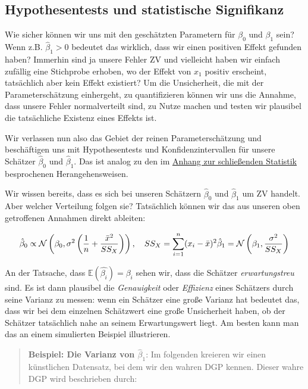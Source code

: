 \documentclass[]{book}
\begin{document}
\subsection{Hypothesentests und statistische
Signifikanz}\label{hypothesentests-und-statistische-signifikanz}

Wie sicher können wir uns mit den geschätzten Parametern für \(\beta_0\)
und \(\beta_1\) sein? Wenn z.B. \(\hat{\beta}_1>0\) bedeutet das
wirklich, dass wir einen positiven Effekt gefunden haben? Immerhin sind
ja unsere Fehler ZV und vielleicht haben wir einfach zufällig eine
Stichprobe erhoben, wo der Effekt von \(x_1\) positiv erscheint,
tatsächlich aber kein Effekt existiert? Um die Unsicherheit, die mit der
Parameterschätzung einhergeht, zu quantifizieren können wir uns die
Annahme, dass unsere Fehler normalverteilt sind, zu Nutze machen und
testen wir plausibel die tatsächliche Existenz eines Effekts ist.

Wir verlassen nun also das Gebiet der reinen Parameterschätzung und
beschäftigen uns mit Hypothesentests und Konfidenzintervallen für unsere
Schätzer \(\hat{\beta}_0\) und \(\hat{\beta}_1\). Das ist analog zu den
im \protect\hyperlink{stat-rep}{Anhang zur schließenden Statistik}
besprochenen Herangehensweisen.

Wir wissen bereits, dass es sich bei unseren Schätzern \(\hat{\beta}_0\)
und \(\hat{\beta}_1\) um ZV handelt. Aber welcher Verteilung folgen sie?
Tatsächlich können wir das aus unseren oben getroffenen Annahmen direkt
ableiten:

\[\hat{\beta}_0 \propto \mathcal{N}\left(\beta_0, \sigma^2\left( \frac{1}{n} +
\frac{\bar{x}^2}{SS_X}\right) \right), \quad SS_X=\sum_{i=1}^n(x_i-\bar{x})^2\\
\hat{\beta}_1 = \mathcal{N}\left(\beta_1, \frac{\sigma^2}{SS_X}\right)\]

An der Tatsache, dass \(\mathbb{E}(\hat{\beta_i})=\beta_i\) sehen wir,
dass die Schätzer \emph{erwartungstreu} sind. Es ist dann plausibel die
\emph{Genauigkeit} oder \emph{Effizienz} eines Schätzers durch seine
Varianz zu messen: wenn ein Schätzer eine große Varianz hat bedeutet
das, dass wir bei dem einzelnen Schätzwert eine große Unsicherheit
haben, ob der Schätzer tatsächlich nahe an seinem Erwartungswert liegt.
Am besten kann man das an einem simulierten Beispiel illustrieren.

\begin{quote}
\textbf{Beispiel: Die Varianz von \(\hat{\beta}_1\)}: Im folgenden
kreieren wir einen künstlichen Datensatz, bei dem wir den wahren DGP
kennen. Dieser wahre DGP wird beschrieben durch:
\end{quote}
\end{document}
